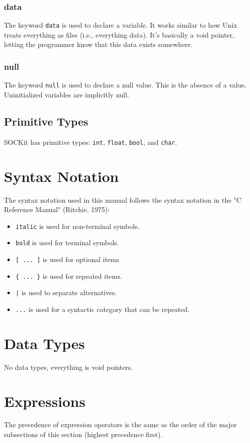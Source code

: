 \documentclass[12pt,a4paper]{article}
\begin{document}
\subsubsection{data}
The keyword \texttt{data} is used to declare a variable. It works similar to how Unix treats everything as files (i.e., everything data). It's basically a void pointer, letting the programmer know that this data exists somewhere.

\subsubsection{null}
The keyword \texttt{null} is used to declare a null value. This is the absence of a value. Uninitialized variables are implicitly null.

\subsection{Primitive Types}
SOCKit has primitive types: \texttt{int}, \texttt{float}, \texttt{bool}, and \texttt{char}.

\section{Syntax Notation}
The syntax notation used in this manual follows the syntax notation in the "C Reference Manual" (Ritchie, 1975):

\begin{itemize}
    \item \texttt{italic} is used for non-terminal symbols.
    \item \texttt{bold} is used for terminal symbols.
    \item \texttt{[ ... ]} is used for optional items.
    \item \texttt{\{ ... \}} is used for repeated items.
    \item \texttt{|} is used to separate alternatives.
    \item \texttt{...} is used for a syntactic category that can be repeated.
\end{itemize}

\section{Data Types}
No data types, everything is void pointers.

\section{Expressions}
The precedence of expression operators is the same as the order of the major subsections of this section (highest precedence first).
\end{document}
